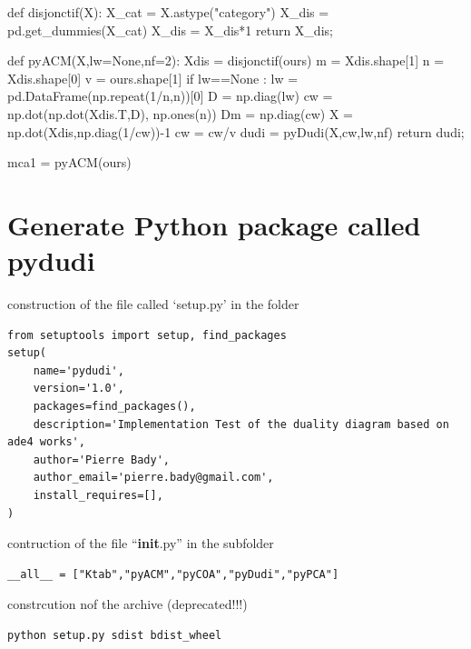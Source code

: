 \documentclass[
  10pt,
]{article}
\newenvironment{Shaded}{\begin{snugshade}}{\end{snugshade}}
\newcommand{\NormalTok}[1]{#1}
\begin{document}
\begin{Shaded}
\begin{Highlighting}[]
\NormalTok{def disjonctif(X):}
\NormalTok{  X\_cat = X.astype("category")}
\NormalTok{  X\_dis = pd.get\_dummies(X\_cat)}
\NormalTok{  X\_dis = X\_dis*1}
\NormalTok{  return X\_dis;}

\NormalTok{def pyACM(X,lw=None,nf=2):}
\NormalTok{  Xdis = disjonctif(ours)}
\NormalTok{  m = Xdis.shape[1]}
\NormalTok{  n = Xdis.shape[0]}
\NormalTok{  v = ours.shape[1]}
\NormalTok{  if lw==None :}
\NormalTok{    lw = pd.DataFrame(np.repeat(1/n,n))[0]}
\NormalTok{  D = np.diag(lw)}
\NormalTok{  cw = np.dot(np.dot(Xdis.T,D), np.ones(n)) }
\NormalTok{  Dm = np.diag(cw)}
\NormalTok{  X = np.dot(Xdis,np.diag(1/cw)){-}1}
\NormalTok{  cw = cw/v}
\NormalTok{  dudi = pyDudi(X,cw,lw,nf)    }
\NormalTok{  return dudi;}
\end{Highlighting}
\end{Shaded}

\begin{Shaded}
\begin{Highlighting}[]
\NormalTok{mca1 = pyACM(ours)}
\end{Highlighting}
\end{Shaded}

\section{Generate Python package called
pydudi}\label{generate-python-package-called-pydudi}

construction of the file called `setup.py' in the folder

\begin{verbatim}
from setuptools import setup, find_packages
setup(
    name='pydudi',
    version='1.0',
    packages=find_packages(),
    description='Implementation Test of the duality diagram based on ade4 works',
    author='Pierre Bady',
    author_email='pierre.bady@gmail.com',
    install_requires=[],
)
\end{verbatim}

contruction of the file ``\textbf{init}.py'' in the subfolder

\begin{verbatim}
__all__ = ["Ktab","pyACM","pyCOA","pyDudi","pyPCA"]
\end{verbatim}

constrcution nof the archive (deprecated!!!)

\begin{verbatim}
python setup.py sdist bdist_wheel
\end{verbatim}
\end{document}
